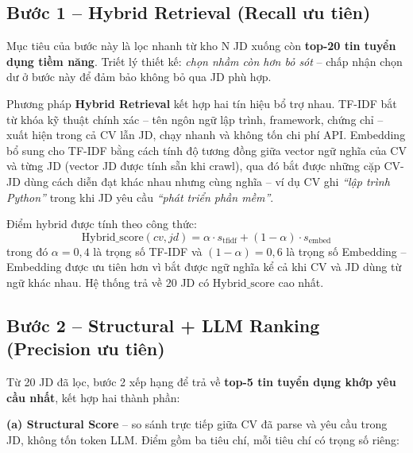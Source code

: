 \documentclass[../DoAn.tex]{subfiles}
\begin{document}
\subsection{Bước 1 -- Hybrid Retrieval (Recall ưu tiên)}

Mục tiêu của bước này là lọc nhanh từ kho N JD xuống còn \textbf{top-20 tin tuyển dụng tiềm năng}. Triết lý thiết kế: \textit{chọn nhầm còn hơn bỏ sót} -- chấp nhận chọn dư ở bước này để đảm bảo không bỏ qua JD phù hợp.

Phương pháp \textbf{Hybrid Retrieval} kết hợp hai tín hiệu bổ trợ nhau. TF-IDF bắt từ khóa kỹ thuật chính xác -- tên ngôn ngữ lập trình, framework, chứng chỉ -- xuất hiện trong cả CV lẫn JD, chạy nhanh và không tốn chi phí API. Embedding bổ sung cho TF-IDF bằng cách tính độ tương đồng giữa vector ngữ nghĩa của CV và từng JD (vector JD được tính sẵn khi crawl), qua đó bắt được những cặp CV-JD dùng cách diễn đạt khác nhau nhưng cùng nghĩa -- ví dụ CV ghi \textit{``lập trình Python''} trong khi JD yêu cầu \textit{``phát triển phần mềm''}.

Điểm hybrid được tính theo công thức:
\begin{equation}
\text{Hybrid\_score}(cv, jd) = \alpha \cdot s_{\text{tfidf}} + (1-\alpha) \cdot s_{\text{embed}}
\label{eq:hybrid}
\end{equation}
trong đó $\alpha = 0{,}4$ là trọng số TF-IDF và $(1-\alpha) = 0{,}6$ là trọng số Embedding -- Embedding được ưu tiên hơn vì bắt được ngữ nghĩa kể cả khi CV và JD dùng từ ngữ khác nhau. Hệ thống trả về 20 JD có $\text{Hybrid\_score}$ cao nhất.

\subsection{Bước 2 -- Structural + LLM Ranking (Precision ưu tiên)}

Từ 20 JD đã lọc, bước 2 xếp hạng để trả về \textbf{top-5 tin tuyển dụng khớp yêu cầu nhất}, kết hợp hai thành phần:

\textbf{(a) Structural Score} -- so sánh trực tiếp giữa CV đã parse và yêu cầu trong JD, không tốn token LLM. Điểm gồm ba tiêu chí, mỗi tiêu chí có trọng số riêng:
\end{document}
